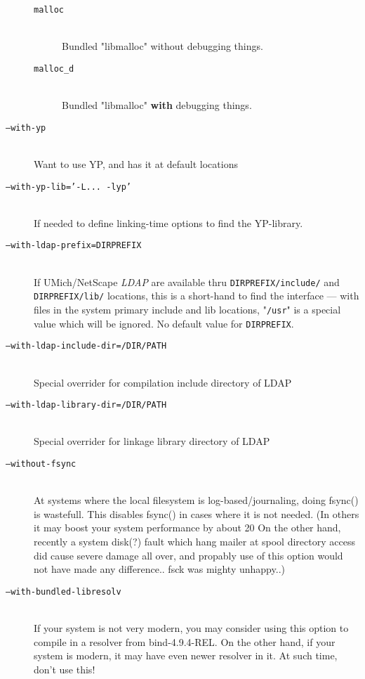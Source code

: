 \begin{description}
\begin{description}
\item[\tt malloc] \mbox{} \\
Bundled "libmalloc" without debugging things.

\item[\tt malloc\_d] \mbox{} \\
Bundled "libmalloc" {\bf with} debugging things.
\end{description}

\item[\tt ---with-yp] \mbox{} \\
Want to use YP, and has it at default locations

\item[\tt ---with-yp-lib='-L... -lyp'] \mbox{} \\
If needed to define linking-time options to find the YP-library.

\item[\tt ---with-ldap-prefix=DIRPREFIX] \mbox{} \\
If UMich/NetScape {\em LDAP} are available thru {\tt DIRPREFIX/include/}
and {\tt DIRPREFIX/lib/} locations, this is a short-hand to find
the interface --- with files in the system primary include
and lib locations,  "{\tt /usr}" is a special value which will be
ignored.  No default value for {\tt DIRPREFIX}.

\item[\tt ---with-ldap-include-dir=/DIR/PATH] \mbox{} \\
Special overrider for compilation include directory of LDAP

\item[\tt ---with-ldap-library-dir=/DIR/PATH] \mbox{} \\
Special overrider for linkage library directory of LDAP

\item[\tt ---without-fsync] \mbox{} \\
At systems where the local filesystem is log-based/journaling,
doing   fsync()  is wastefull.  This disables fsync() in
cases where it is not needed.    (In others it may boost
your system performance by about 20%
On the other hand, recently a system disk(?) fault which
hang mailer at spool directory access did cause severe
damage all over, and propably use of this option would
not have made any difference..  fsck was mighty unhappy..)

\item[\tt ---with-bundled-libresolv] \mbox{} \\
If your system is not very modern, you may consider using
this option to compile in a resolver from bind-4.9.4-REL.
On the other hand, if your system is modern, it may have
even newer resolver in it.  At such time, don't use this!


\end{description}
